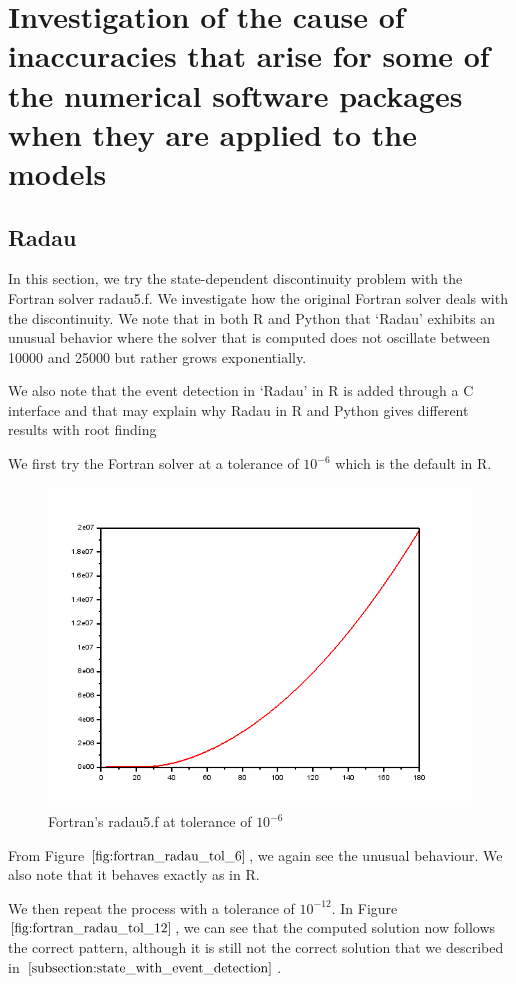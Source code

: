 
\section{Investigation of the cause of inaccuracies that arise for some of the numerical software packages when they are applied to the models}
\label{section:fortran_inaccuracies}
\subsection{Radau}
In this section, we try the state-dependent discontinuity problem with the Fortran solver radau5.f. We investigate how the original Fortran solver deals with the discontinuity. We note that in both R and Python that `Radau' exhibits an unusual behavior where the solver that is computed does not oscillate between 10000 and 25000 but rather grows exponentially. 

We also note that the event detection in `Radau' in R is added through a C interface and that may explain why Radau in R and Python gives different results with root finding

We first try the Fortran solver at a tolerance of $10^{-6}$ which is the default in R.
\begin{figure}[h]
\centering
\includegraphics[width=0.7\linewidth]{./figures/fortran_radau_tol_6}
\caption{Fortran's radau5.f at tolerance of $10^{-6}$}
\label{fig:fortran_radau_tol_6}
\end{figure}

From Figure $\ref{fig:fortran_radau_tol_6}$, we again see the unusual behaviour. We also note that it behaves exactly as in R.

We then repeat the process with a tolerance of $10^{-12}$. In Figure $\ref{fig:fortran_radau_tol_12}$, we can see that the computed solution now follows the correct pattern, although it is still not the correct solution that we described in $\ref{subsection:state_with_event_detection}$.

